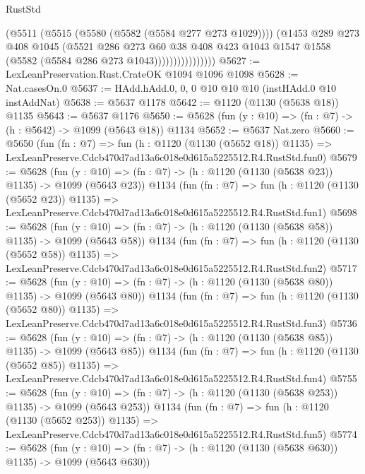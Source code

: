 \begin{lexlean}{RustStd}
\begin{coremodule}
                          (@5511
                            (@5515 (@5580 (@5582 (@5584 @277 @273 @1029))))
                            (@1453
                              @289
                              @273
                              @408
                              @1045
                              (@5521
                                @286
                                @273
                                @60
                                @38
                                @408
                                @423
                                @1043
                                @1547
                                @1558
                                (@5582 (@5584 @286 @273 @1043))))))))))))))))
@5627 := LexLeanPreservation.Rust.CrateOK @1094 @1096 @1098
@5628 := Nat.casesOn.{0}
@5637 := HAdd.hAdd.{0, 0, 0} @10 @10 @10 (instHAdd.{0} @10 instAddNat)
@5638 := @5637 @1178
@5642 := @1120 (@1130 (@5638 @18)) @1135
@5643 := @5637 @1176
@5650 := @5628 (fun (y : @10) => (fn : @7) -> (h : @5642) -> @1099 (@5643 @18)) @1134
@5652 := @5637 Nat.zero
@5660 := @5650
    (fun (fn : @7) =>
    fun (h : @1120 (@1130 (@5652 @18)) @1135) =>
    LexLeanPreserve.Cdcb470d7ad13a6c018e0d615a5225512.R4.RustStd.fun0)
@5679 := @5628
    (fun (y : @10) => (fn : @7) -> (h : @1120 (@1130 (@5638 @23)) @1135) -> @1099 (@5643 @23))
    @1134
    (fun (fn : @7) =>
    fun (h : @1120 (@1130 (@5652 @23)) @1135) =>
    LexLeanPreserve.Cdcb470d7ad13a6c018e0d615a5225512.R4.RustStd.fun1)
@5698 := @5628
    (fun (y : @10) => (fn : @7) -> (h : @1120 (@1130 (@5638 @58)) @1135) -> @1099 (@5643 @58))
    @1134
    (fun (fn : @7) =>
    fun (h : @1120 (@1130 (@5652 @58)) @1135) =>
    LexLeanPreserve.Cdcb470d7ad13a6c018e0d615a5225512.R4.RustStd.fun2)
@5717 := @5628
    (fun (y : @10) => (fn : @7) -> (h : @1120 (@1130 (@5638 @80)) @1135) -> @1099 (@5643 @80))
    @1134
    (fun (fn : @7) =>
    fun (h : @1120 (@1130 (@5652 @80)) @1135) =>
    LexLeanPreserve.Cdcb470d7ad13a6c018e0d615a5225512.R4.RustStd.fun3)
@5736 := @5628
    (fun (y : @10) => (fn : @7) -> (h : @1120 (@1130 (@5638 @85)) @1135) -> @1099 (@5643 @85))
    @1134
    (fun (fn : @7) =>
    fun (h : @1120 (@1130 (@5652 @85)) @1135) =>
    LexLeanPreserve.Cdcb470d7ad13a6c018e0d615a5225512.R4.RustStd.fun4)
@5755 := @5628
    (fun (y : @10) => (fn : @7) -> (h : @1120 (@1130 (@5638 @253)) @1135) -> @1099 (@5643 @253))
    @1134
    (fun (fn : @7) =>
    fun (h : @1120 (@1130 (@5652 @253)) @1135) =>
    LexLeanPreserve.Cdcb470d7ad13a6c018e0d615a5225512.R4.RustStd.fun5)
@5774 := @5628
    (fun (y : @10) => (fn : @7) -> (h : @1120 (@1130 (@5638 @630)) @1135) -> @1099 (@5643 @630))

\end{coremodule}
\end{lexlean}
